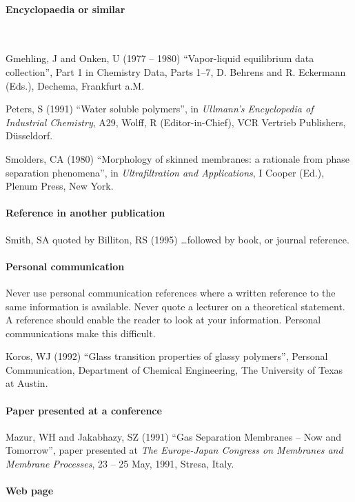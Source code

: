 \documentclass[a5paper, 10pt]{article}
\begin{document}
\paragraph{Encyclopaedia or similar}
~

Gmehling, J and Onken, U (1977 -- 1980) ``Vapor-liquid
  equilibrium data collection'', Part 1 in Chemistry Data, Parts 1--7,
  D.  Behrens and R.  Eckermann (Eds.), Dechema, Frankfurt a.M.

Peters, S (1991) ``Water soluble polymers'', in
  \textit{Ullmann's Encyclopedia of Industrial Chemistry}, A29, Wolff,
  R (Editor-in-Chief), VCR Vertrieb Publishers, D\"usseldorf.

Smolders, CA (1980) ``Morphology of skinned membranes: a
  rationale from phase separation phenomena'', in
  \textit{Ultrafiltration and Applications}, I Cooper (Ed.), Plenum
  Press, New York.

\paragraph{Reference in another publication}

Smith, SA quoted by Billiton, RS (1995) \dots followed by
  book, or journal reference.


\paragraph{Personal communication}
Never use personal communication references where a written reference
to the same information is available.  Never quote a lecturer on a
theoretical statement.  A reference should enable the reader to look
at your information.  Personal communications make this difficult.

Koros, WJ (1992) ``Glass transition properties of glassy
  polymers'', Personal Communication, Department of Chemical
  Engineering, The University of Texas at Austin.

\paragraph{Paper presented at a conference}

Mazur, WH and Jakabhazy, SZ (1991) ``Gas Separation Membranes
  -- Now and Tomorrow'', paper presented at \textit{The Europe-Japan
    Congress on Membranes and Membrane Processes}, 23 -- 25 May, 1991,
  Stresa, Italy.

\paragraph{Web page}
\end{document}

